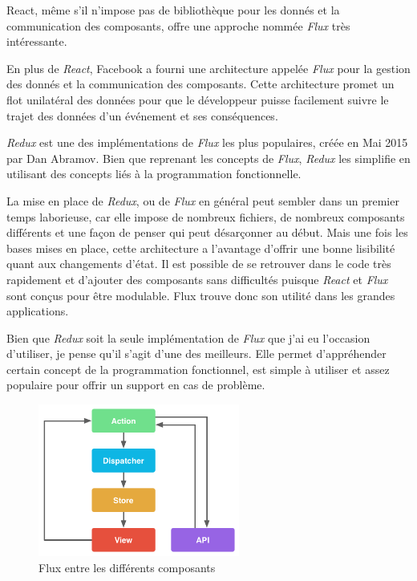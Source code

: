 React, même s'il n'impose pas de bibliothèque pour les donnés et la
communication des composants, offre une approche nommée \emph{Flux} très
intéressante.

\bigskip

En plus de \emph{React}, Facebook a fourni une architecture appelée
\emph{Flux} pour la gestion des donnés et la communication des
composants. Cette architecture promet un flot unilatéral des données
pour que le développeur puisse facilement suivre le trajet des données
d'un événement et ses conséquences.

\bigskip

\emph{Redux} est une des implémentations de \emph{Flux} les plus
populaires, créée en Mai 2015 par Dan Abramov. Bien que reprenant les
concepts de \emph{Flux}, \emph{Redux} les simplifie en utilisant des
concepts liés à la programmation fonctionnelle.

\bigskip

La mise en place de \emph{Redux}, ou de \emph{Flux} en général peut
sembler dans un premier temps laborieuse, car elle impose de nombreux
fichiers, de nombreux composants différents et une façon de penser qui
peut désarçonner au début. Mais une fois les bases mises en place, cette
architecture a l'avantage d'offrir une bonne lisibilité quant aux
changements d'état. Il est possible de se retrouver dans le code très
rapidement et d'ajouter des composants sans difficultés puisque
\emph{React} et \emph{Flux} sont conçus pour être modulable. Flux trouve
donc son utilité dans les grandes applications.

\bigskip

Bien que \emph{Redux} soit la seule implémentation de \emph{Flux} que
j'ai eu l'occasion d'utiliser, je pense qu'il s'agit d'une des
meilleurs. Elle permet d'appréhender certain concept de la programmation
fonctionnel, est simple à utiliser et assez populaire pour offrir un
support en cas de problème.

\bigskip

\begin{figure}[h]
  \centering
  \includegraphics[height=5cm]{figures/react.png}
  \caption{Flux entre les différents composants}
\end{figure}

